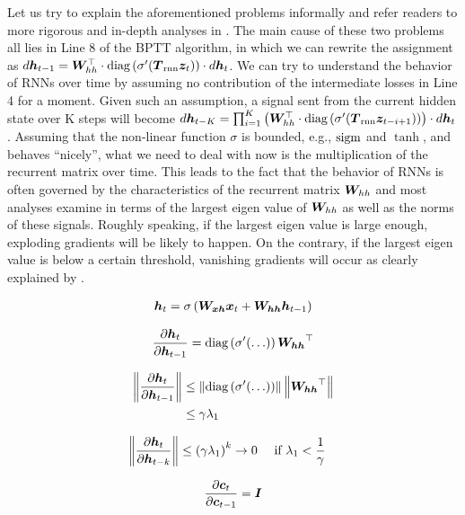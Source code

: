 Let us try to explain the aforementioned problems informally and 
refer readers to more rigorous and in-depth analyses in \cite{Bengio-trnn94,lstm97,MartensS11,pascanu13}.
The main cause of these two problems all lies in Line 8 of the BPTT
algorithm, in which we can rewrite the assignment as
$d\bm{h}_{t-1} = \bm{W}_{hh}^\top \cdot \text{diag}\left(\sigma'(\mbox{\boldmath{$T$}}_{\text{rnn}} \bm{z}_{t})\right) \cdot
d\bm{h}_{t}$. We can try to understand the behavior of RNNs over time by assuming
no contribution of the intermediate losses in Line 4
for a moment. Given such an assumption, a signal sent from the current hidden state over K
steps will become 
$d\bm{h}_{t-K} = \prod_{i=1}^{K} \left(\bm{W}_{hh}^\top \cdot \text{diag}\left(\sigma'(\mbox{\boldmath{$T$}}_{\text{rnn}}
\bm{z}_{t-i+1})\right)\right) \cdot
d\bm{h}_{t}$. Assuming that the non-linear function $\sigma$ is bounded, e.g.,
$\operatorname{sigm}$ and $\tanh$, and behaves ``nicely'', what we need to deal with now is
the multiplication of the recurrent matrix over time.
This leads to the fact that the behavior of RNNs is often governed by the characteristics of the recurrent matrix
$\bm{W}_{hh}$ and most analyses examine in terms of the largest eigen value of
$\bm{W}_{hh}$ as well as the norms of these signals. Roughly speaking, if the largest eigen value
is large enough, exploding gradients will be likely to happen. On the contrary,
if the largest eigen value is below a certain threshold, vanishing gradients
will occur as clearly explained by .

\begin{align}
\mbox{\boldmath{$h$}}_t = \sigma \left(
\mbox{\boldmath{$W_{xh}$}}\mbox{\boldmath{$x$}}_t + \mbox{\boldmath{$W_{hh}$}}\mbox{\boldmath{$h$}}_{t-1}
\right)
\end{align}

\begin{align}
\frac{\partial \mbox{\boldmath{$h$}}_t}{\partial \mbox{\boldmath{$h$}}_{t-1}} = \text{diag}\left(\sigma'(\ldots)\right)\mbox{\boldmath{$W_{hh}$}}^\top
\end{align}

\begin{align}
\left\lVert\frac{\partial \mbox{\boldmath{$h$}}_t}{\partial \mbox{\boldmath{$h$}}_{t-1}}\right\rVert & \leq \left\lVert\text{diag}\left(\sigma'(\ldots)\right)\right\rVert 
\left\lVert\mbox{\boldmath{$W_{hh}$}}^\top\right\rVert \\ 
& \leq \gamma \lambda_1
\end{align}

\begin{align}
\left\lVert\frac{\partial \mbox{\boldmath{$h$}}_t}{\partial \mbox{\boldmath{$h$}}_{t-k}}\right\rVert \leq \left(\gamma \lambda_1\right)^{k}
\rightarrow 0 & \quad \text{ if } \lambda_1 < \frac{1}{\gamma}
\end{align}

\begin{align}
\frac{\partial \mbox{\boldmath{$c$}}_t}{\partial \mbox{\boldmath{$c$}}_{t-1}} = \mbox{\boldmath{$I$}}
\end{align}


